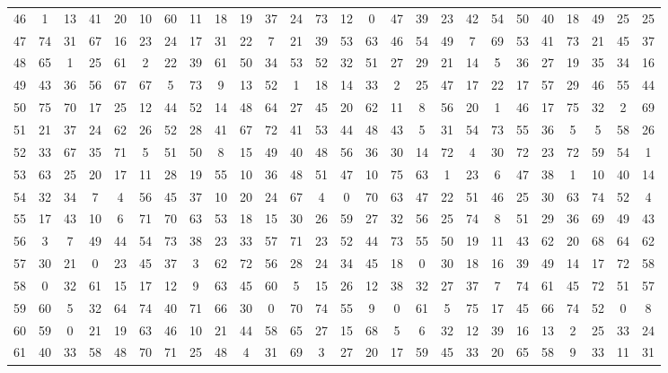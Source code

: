 \begin{table}
\begin{tabular}{c c c c c c c c c c c c c c c c c c c c c c c c c c }
46 & 1 & 13 & 41 & 20 & 10 & 60 & 11 & 18 & 19 & 37 & 24 & 73 & 12 & 0 & 47 & 39 & 23 & 42 & 54 & 50 & 40 & 18 & 49 & 25 & 25 \\
47 & 74 & 31 & 67 & 16 & 23 & 24 & 17 & 31 & 22 & 7 & 21 & 39 & 53 & 63 & 46 & 54 & 49 & 7 & 69 & 53 & 41 & 73 & 21 & 45 & 37 \\
48 & 65 & 1 & 25 & 61 & 2 & 22 & 39 & 61 & 50 & 34 & 53 & 52 & 32 & 51 & 27 & 29 & 21 & 14 & 5 & 36 & 27 & 19 & 35 & 34 & 16 \\
49 & 43 & 36 & 56 & 67 & 67 & 5 & 73 & 9 & 13 & 52 & 1 & 18 & 14 & 33 & 2 & 25 & 47 & 17 & 22 & 17 & 57 & 29 & 46 & 55 & 44 \\
50 & 75 & 70 & 17 & 25 & 12 & 44 & 52 & 14 & 48 & 64 & 27 & 45 & 20 & 62 & 11 & 8 & 56 & 20 & 1 & 46 & 17 & 75 & 32 & 2 & 69 \\
51 & 21 & 37 & 24 & 62 & 26 & 52 & 28 & 41 & 67 & 72 & 41 & 53 & 44 & 48 & 43 & 5 & 31 & 54 & 73 & 55 & 36 & 5 & 5 & 58 & 26 \\
52 & 33 & 67 & 35 & 71 & 5 & 51 & 50 & 8 & 15 & 49 & 40 & 48 & 56 & 36 & 30 & 14 & 72 & 4 & 30 & 72 & 23 & 72 & 59 & 54 & 1 \\
53 & 63 & 25 & 20 & 17 & 11 & 28 & 19 & 55 & 10 & 36 & 48 & 51 & 47 & 10 & 75 & 63 & 1 & 23 & 6 & 47 & 38 & 1 & 10 & 40 & 14 \\
54 & 32 & 34 & 7 & 4 & 56 & 45 & 37 & 10 & 20 & 24 & 67 & 4 & 0 & 70 & 63 & 47 & 22 & 51 & 46 & 25 & 30 & 63 & 74 & 52 & 4 \\
55 & 17 & 43 & 10 & 6 & 71 & 70 & 63 & 53 & 18 & 15 & 30 & 26 & 59 & 27 & 32 & 56 & 25 & 74 & 8 & 51 & 29 & 36 & 69 & 49 & 43 \\
56 & 3 & 7 & 49 & 44 & 54 & 73 & 38 & 23 & 33 & 57 & 71 & 23 & 52 & 44 & 73 & 55 & 50 & 19 & 11 & 43 & 62 & 20 & 68 & 64 & 62 \\
57 & 30 & 21 & 0 & 23 & 45 & 37 & 3 & 62 & 72 & 56 & 28 & 24 & 34 & 45 & 18 & 0 & 30 & 18 & 16 & 39 & 49 & 14 & 17 & 72 & 58 \\
58 & 0 & 32 & 61 & 15 & 17 & 12 & 9 & 63 & 45 & 60 & 5 & 15 & 26 & 12 & 38 & 32 & 27 & 37 & 7 & 74 & 61 & 45 & 72 & 51 & 57 \\
59 & 60 & 5 & 32 & 64 & 74 & 40 & 71 & 66 & 30 & 0 & 70 & 74 & 55 & 9 & 0 & 61 & 5 & 75 & 17 & 45 & 66 & 74 & 52 & 0 & 8 \\
60 & 59 & 0 & 21 & 19 & 63 & 46 & 10 & 21 & 44 & 58 & 65 & 27 & 15 & 68 & 5 & 6 & 32 & 12 & 39 & 16 & 13 & 2 & 25 & 33 & 24 \\
61 & 40 & 33 & 58 & 48 & 70 & 71 & 25 & 48 & 4 & 31 & 69 & 3 & 27 & 20 & 17 & 59 & 45 & 33 & 20 & 65 & 58 & 9 & 33 & 11 & 31 \\

\end{tabular}
\end{table}
